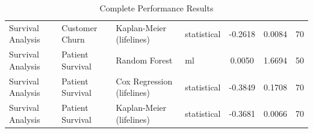 \documentclass[11pt,a4paper]{article}
\begin{document}
\begin{table}[h!]
\begin{tabular}{llllccc}
Survival Analysis & Customer Churn & Kaplan-Meier (lifelines) & statistical & -0.2618 & 0.0084 & 70 \\
Survival Analysis & Patient Survival & Random Forest & ml & 0.0050 & 1.6694 & 50 \\
Survival Analysis & Patient Survival & Cox Regression (lifelines) & statistical & -0.3849 & 0.1708 & 70 \\
Survival Analysis & Patient Survival & Kaplan-Meier (lifelines) & statistical & -0.3681 & 0.0066 & 70 \\
\bottomrule
\end{tabular}
\caption{Complete Performance Results}
\end{table}
\end{document}
